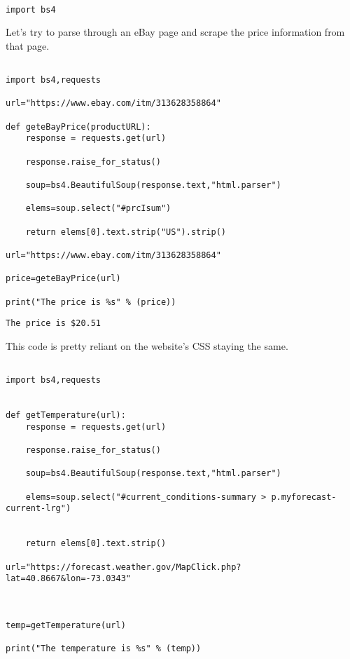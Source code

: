 \documentclass[11pt]{article}
\begin{document}
\begin{verbatim}

import bs4

\end{verbatim}

Let's try to parse through an eBay page and scrape the price information from that page.

\begin{verbatim}

import bs4,requests

url="https://www.ebay.com/itm/313628358864"

def geteBayPrice(productURL):
    response = requests.get(url)

    response.raise_for_status()

    soup=bs4.BeautifulSoup(response.text,"html.parser")

    elems=soup.select("#prcIsum")

    return elems[0].text.strip("US").strip()

url="https://www.ebay.com/itm/313628358864"

price=geteBayPrice(url)

print("The price is %s" % (price))

\end{verbatim}

\begin{verbatim}
The price is $20.51
\end{verbatim}


This code is pretty reliant on the website's CSS staying the same.

\begin{verbatim}

import bs4,requests


def getTemperature(url):
    response = requests.get(url)

    response.raise_for_status()

    soup=bs4.BeautifulSoup(response.text,"html.parser")

    elems=soup.select("#current_conditions-summary > p.myforecast-current-lrg")


    return elems[0].text.strip()

url="https://forecast.weather.gov/MapClick.php?lat=40.8667&lon=-73.0343"



temp=getTemperature(url)

print("The temperature is %s" % (temp))

\end{verbatim}
\end{document}
